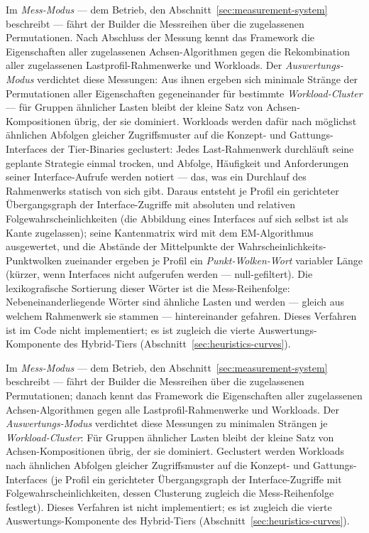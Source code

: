 \begin{nurlang}
Im \emph{Mess-Modus} --- dem Betrieb, den Abschnitt~\ref{sec:measurement-system} beschreibt --- fährt
der Builder die Messreihen über die zugelassenen Permutationen. Nach Abschluss der Messung kennt das
Framework die Eigenschaften aller zugelassenen Achsen-Algorithmen gegen die Rekombination aller
zugelassenen Lastprofil-Rahmenwerke und Workloads. Der \emph{Auswertungs-Modus} verdichtet diese
Messungen: Aus ihnen ergeben sich minimale Stränge der Permutationen aller Eigenschaften gegeneinander
für bestimmte \emph{Workload-Cluster} --- für Gruppen ähnlicher Lasten bleibt der kleine Satz von
Achsen-Kompositionen übrig, der sie dominiert. Workloads werden dafür nach möglichst ähnlichen Abfolgen
gleicher Zugriffsmuster auf die Konzept- und Gattungs-Interfaces der Tier-Binaries geclustert: Jedes
Last-Rahmenwerk durchläuft seine geplante Strategie einmal trocken, und Abfolge, Häufigkeit und
Anforderungen seiner Interface-Aufrufe werden notiert --- das, was ein Durchlauf des Rahmenwerks statisch
von sich gibt. Daraus entsteht je Profil ein gerichteter Übergangsgraph der Interface-Zugriffe mit
absoluten und relativen Folgewahrscheinlichkeiten (die Abbildung eines Interfaces auf sich selbst ist
als Kante zugelassen); seine Kantenmatrix wird mit dem EM-Algorithmus~\cite{dempster1977em}
ausgewertet, und die Abstände der Mittelpunkte der Wahrscheinlichkeits-Punktwolken zueinander ergeben
je Profil ein \emph{Punkt-Wolken-Wort} variabler Länge (kürzer, wenn Interfaces nicht aufgerufen werden
--- null-gefiltert). Die lexikografische Sortierung dieser Wörter ist die Mess-Reihenfolge:
Nebeneinanderliegende Wörter sind ähnliche Lasten und werden --- gleich aus welchem Rahmenwerk sie
stammen --- hintereinander gefahren. Dieses Verfahren ist im Code nicht implementiert; es ist zugleich die
vierte Auswertungs-Komponente des Hybrid-Tiers (Abschnitt~\ref{sec:heuristics-curves}).
\end{nurlang}
\begin{nurkurz}
Im \emph{Mess-Modus} --- dem Betrieb, den Abschnitt~\ref{sec:measurement-system} beschreibt --- fährt der
Builder die Messreihen über die zugelassenen Permutationen; danach kennt das Framework die Eigenschaften aller
zugelassenen Achsen-Algorithmen gegen alle Lastprofil-Rahmenwerke und Workloads. Der \emph{Auswertungs-Modus}
verdichtet diese Messungen zu minimalen Strängen je \emph{Workload-Cluster}: Für Gruppen ähnlicher Lasten
bleibt der kleine Satz von Achsen-Kompositionen übrig, der sie dominiert. Geclustert werden Workloads nach
ähnlichen Abfolgen gleicher Zugriffsmuster auf die Konzept- und Gattungs-Interfaces (je Profil ein gerichteter
Übergangsgraph der Interface-Zugriffe mit Folgewahrscheinlichkeiten, dessen Clusterung zugleich die
Mess-Reihenfolge festlegt). Dieses Verfahren ist nicht implementiert; es ist zugleich die vierte
Auswertungs-Komponente des Hybrid-Tiers (Abschnitt~\ref{sec:heuristics-curves}).
\end{nurkurz}

